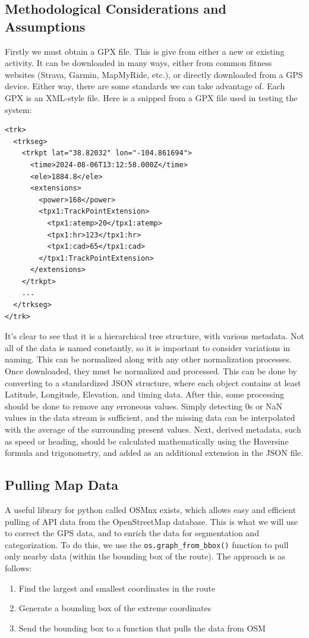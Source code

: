 \documentclass[11pt,twoside]{report}
\begin{document}
\subsection{Methodological Considerations and Assumptions}
Firstly we must obtain a GPX file. This is give from either a new or existing activity. It can be downloaded in many ways, either from common fitness websites (Strava, Garmin, MapMyRide, etc.), or directly
downloaded from a GPS device. Either way, there are some standards we can take advantage of. Each GPX is an XML-style file. Here is a snipped from
a GPX file used in testing the system:
\begin{verbatim}
<trk>
  <trkseg>
    <trkpt lat="38.82032" lon="-104.861694">
      <time>2024-08-06T13:12:58.000Z</time>
      <ele>1884.8</ele>
      <extensions>
        <power>168</power>
        <tpx1:TrackPointExtension>
          <tpx1:atemp>20</tpx1:atemp>
          <tpx1:hr>123</tpx1:hr>
          <tpx1:cad>65</tpx1:cad>
        </tpx1:TrackPointExtension>
      </extensions>
    </trkpt>
    ...
  </trkseg>
</trk>

\end{verbatim}
It's clear to see that it is a hierarchical tree structure, with various metadata. Not all of the data is named constantly, so it is important
to consider variations in naming. This can be normalized along with any other normalization processes.
\\
Once downloaded, they must be normalized and processed. This can be done by converting to a standardized JSON structure, where each object contains at least Latitude, Longitude, Elevation, and timing data.
After this, some processing should be done to remove any erroneous values. Simply detecting 0s or NaN values in the data stream is sufficient, and the missing data can be interpolated with the average of the surrounding present values.
Next, derived metadata, such as speed or heading, should be calculated mathematically using the Haversine formula and trigonometry, and added as an additional extension in the JSON file.

\subsection{Pulling Map Data}
A useful library for python called OSMnx exists, which allows easy and efficient pulling of API data from the OpenStreetMap database. This is what we will use to correct the GPS data, and to enrich the data for segmentation and categorization.
To do this, we use the \texttt{os.graph\_from\_bbox()} function to pull only nearby data (within the bounding box of the route). The approach is as follows:
\begin{enumerate}
	\item Find the largest and smallest coordinates in the route
	\item Generate a bounding box of the extreme coordinates
	\item Send the bounding box to a function that pulls the data from OSM
\end{enumerate}
\end{document}
